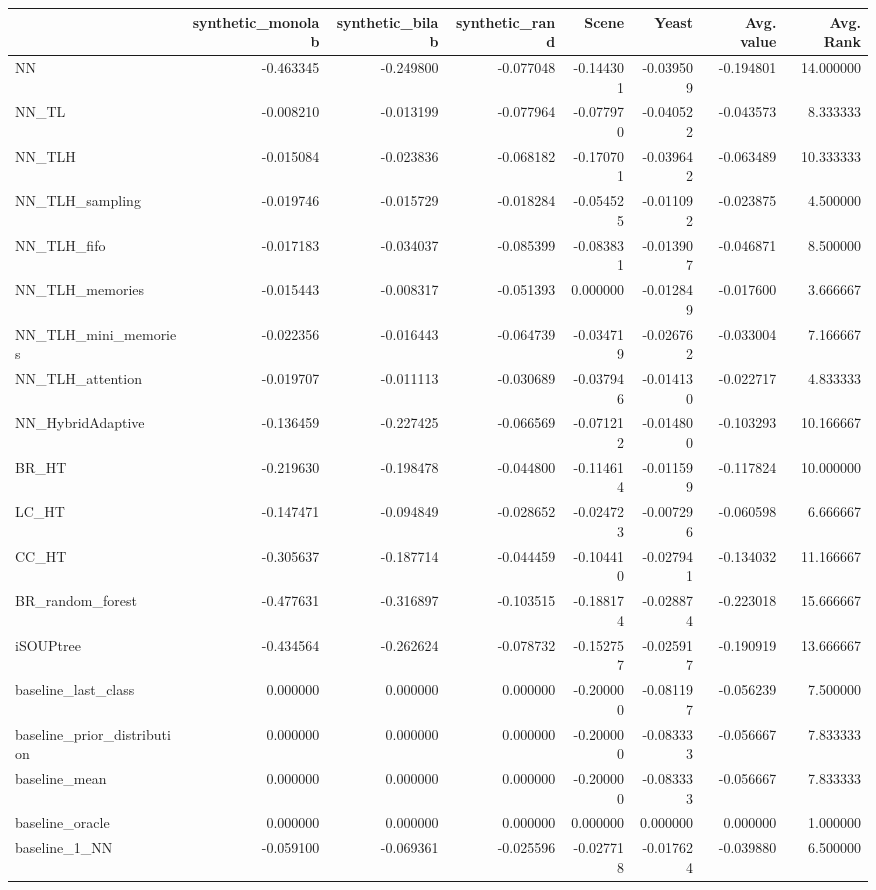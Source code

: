 \begin{tabular}{lrrrrrrr}
\toprule
 & synthetic_monolab & synthetic_bilab & synthetic_rand & Scene & Yeast & Avg. value & Avg. Rank \\
\midrule
NN & -0.463345 & -0.249800 & -0.077048 & -0.144301 & -0.039509 & -0.194801 & 14.000000 \\
NN_TL & -0.008210 & -0.013199 & -0.077964 & -0.077970 & -0.040522 & -0.043573 & 8.333333 \\
NN_TLH & -0.015084 & -0.023836 & -0.068182 & -0.170701 & -0.039642 & -0.063489 & 10.333333 \\
NN_TLH_sampling & -0.019746 & -0.015729 & -0.018284 & -0.054525 & -0.011092 & -0.023875 & 4.500000 \\
NN_TLH_fifo & -0.017183 & -0.034037 & -0.085399 & -0.083831 & -0.013907 & -0.046871 & 8.500000 \\
NN_TLH_memories & -0.015443 & -0.008317 & -0.051393 & 0.000000 & -0.012849 & -0.017600 & 3.666667 \\
NN_TLH_mini_memories & -0.022356 & -0.016443 & -0.064739 & -0.034719 & -0.026762 & -0.033004 & 7.166667 \\
NN_TLH_attention & -0.019707 & -0.011113 & -0.030689 & -0.037946 & -0.014130 & -0.022717 & 4.833333 \\
NN_HybridAdaptive & -0.136459 & -0.227425 & -0.066569 & -0.071212 & -0.014800 & -0.103293 & 10.166667 \\
BR_HT & -0.219630 & -0.198478 & -0.044800 & -0.114614 & -0.011599 & -0.117824 & 10.000000 \\
LC_HT & -0.147471 & -0.094849 & -0.028652 & -0.024723 & -0.007296 & -0.060598 & 6.666667 \\
CC_HT & -0.305637 & -0.187714 & -0.044459 & -0.104410 & -0.027941 & -0.134032 & 11.166667 \\
BR_random_forest & -0.477631 & -0.316897 & -0.103515 & -0.188174 & -0.028874 & -0.223018 & 15.666667 \\
iSOUPtree & -0.434564 & -0.262624 & -0.078732 & -0.152757 & -0.025917 & -0.190919 & 13.666667 \\
baseline_last_class & 0.000000 & 0.000000 & 0.000000 & -0.200000 & -0.081197 & -0.056239 & 7.500000 \\
baseline_prior_distribution & 0.000000 & 0.000000 & 0.000000 & -0.200000 & -0.083333 & -0.056667 & 7.833333 \\
baseline_mean & 0.000000 & 0.000000 & 0.000000 & -0.200000 & -0.083333 & -0.056667 & 7.833333 \\
baseline_oracle & 0.000000 & 0.000000 & 0.000000 & 0.000000 & 0.000000 & 0.000000 & 1.000000 \\
baseline_1_NN & -0.059100 & -0.069361 & -0.025596 & -0.027718 & -0.017624 & -0.039880 & 6.500000 \\
\bottomrule
\end{tabular}
